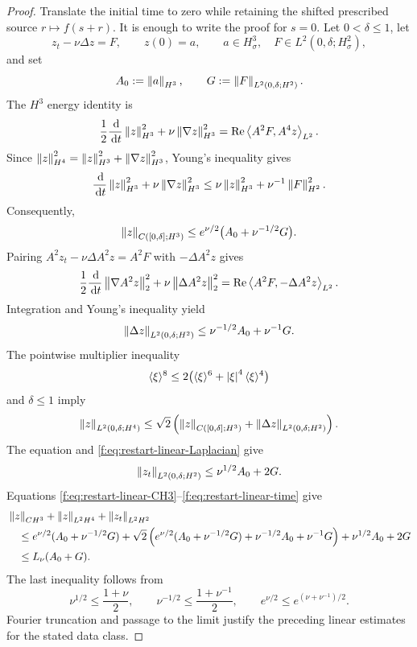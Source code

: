 \begin{proof}
Translate the initial time to zero while retaining the shifted prescribed
source \(r\mapsto f(s+r)\).  It is enough to write the proof for
\(s=0\).
Let \(0<\delta\le1\), let
\[
 z_t-\nu\Delta z=F,
 \qquad z(0)=a,
 \qquad
 a\in H^3_\sigma,\quad
 F\in L^2(0,\delta;H^2_\sigma),
\]
and set
\[
 A_0:=\left\lVert a\right\rVert_{H^3},
 \qquad
 G:=\left\lVert F\right\rVert_{L^2(0,\delta;H^2)}.
\]
The \(H^3\) energy identity is
\[
 \frac12\frac{\,\mathrm d}{\,\mathrm d t}\left\lVert z\right\rVert_{H^3}^2
 +\nu\left\lVert \nabla z\right\rVert_{H^3}^2
 =\operatorname{Re}\left\langle A^2F,A^4z\right\rangle_{L^2}.
\]
Since
\(\left\lVert z\right\rVert_{H^4}^2=\left\lVert z\right\rVert_{H^3}^2+\left\lVert \nabla z\right\rVert_{H^3}^2\),
Young's inequality gives
\[
 \frac{\,\mathrm d}{\,\mathrm d t}\left\lVert z\right\rVert_{H^3}^2
 +\nu\left\lVert \nabla z\right\rVert_{H^3}^2
 \le \nu\left\lVert z\right\rVert_{H^3}^2+\nu^{-1}\left\lVert F\right\rVert_{H^2}^2.
\]
Consequently,
\begin{equation}
 \left\lVert z\right\rVert_{C([0,\delta];H^3)}
 \le e^{\nu/2}\bigl(A_0+\nu^{-1/2}G\bigr).
 \label{f:eq:restart-linear-CH3}
\end{equation}
Pairing \(A^2z_t-\nu\Delta A^2z=A^2F\) with
\(-\Delta A^2z\) gives
\[
 \frac12\frac{\,\mathrm d}{\,\mathrm d t}\left\lVert \nabla A^2z\right\rVert_2^2
 +\nu\left\lVert \Delta A^2z\right\rVert_2^2
 =\operatorname{Re}\left\langle A^2F,-\Delta A^2z\right\rangle_{L^2}.
\]
Integration and Young's inequality yield
\begin{equation}
 \left\lVert \Delta z\right\rVert_{L^2(0,\delta;H^2)}
 \le \nu^{-1/2}A_0+\nu^{-1}G.
 \label{f:eq:restart-linear-Laplacian}
\end{equation}
The pointwise multiplier inequality
\[
 \langle\xi\rangle^8
 \le2\bigl(\langle\xi\rangle^6
       +\left|\xi\right|^4\langle\xi\rangle^4\bigr)
\]
and \(\delta\le1\) imply
\begin{equation}
 \left\lVert z\right\rVert_{L^2(0,\delta;H^4)}
 \le\sqrt2\left(
 \left\lVert z\right\rVert_{C([0,\delta];H^3)}
 +\left\lVert \Delta z\right\rVert_{L^2(0,\delta;H^2)}
 \right).
 \label{f:eq:restart-linear-H4}
\end{equation}
The equation and \eqref{f:eq:restart-linear-Laplacian} give
\begin{equation}
 \left\lVert z_t\right\rVert_{L^2(0,\delta;H^2)}
 \le\nu^{1/2}A_0+2G.
 \label{f:eq:restart-linear-time}
\end{equation}
Equations \eqref{f:eq:restart-linear-CH3}--\eqref{f:eq:restart-linear-time}
give
\begin{align*}
 &\left\lVert z\right\rVert_{C H^3}+\left\lVert z\right\rVert_{L^2H^4}+\left\lVert z_t\right\rVert_{L^2H^2}\\
 &\quad\le
 e^{\nu/2}(A_0+\nu^{-1/2}G)
 +\sqrt2\left(
 e^{\nu/2}(A_0+\nu^{-1/2}G)
 +\nu^{-1/2}A_0+\nu^{-1}G\right)
 +\nu^{1/2}A_0+2G\\
 &\quad\le L_\nu(A_0+G).
\end{align*}
The last inequality follows from
\[
 \nu^{1/2}\le\frac{1+\nu}{2},
 \qquad
 \nu^{-1/2}\le\frac{1+\nu^{-1}}2,
 \qquad
 e^{\nu/2}\le e^{(\nu+\nu^{-1})/2}.
\]
Fourier truncation and passage to the limit justify the preceding linear
estimates for the stated data class.


\end{proof}
